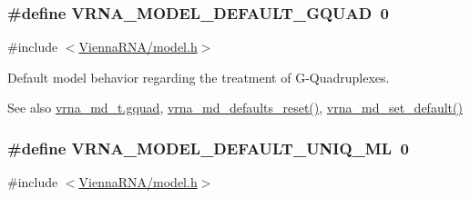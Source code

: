 \subsubsection[{\texorpdfstring{V\+R\+N\+A\+\_\+\+M\+O\+D\+E\+L\+\_\+\+D\+E\+F\+A\+U\+L\+T\+\_\+\+G\+Q\+U\+AD}{VRNA_MODEL_DEFAULT_GQUAD}}]{\setlength{\rightskip}{0pt plus 5cm}\#define V\+R\+N\+A\+\_\+\+M\+O\+D\+E\+L\+\_\+\+D\+E\+F\+A\+U\+L\+T\+\_\+\+G\+Q\+U\+AD~0}\hypertarget{group__model__details_ga793ed812e86f43799b14b2deee917f23}{}\label{group__model__details_ga793ed812e86f43799b14b2deee917f23}


{\ttfamily \#include $<$\hyperlink{model_8h}{Vienna\+R\+N\+A/model.\+h}$>$}



Default model behavior regarding the treatment of G-\/\+Quadruplexes. 

\begin{DoxySeeAlso}{See also}
\hyperlink{structvrna__md__s_af88a511a2b1f526b4c6213de6cb8fd6e}{vrna\+\_\+md\+\_\+t.\+gquad}, \hyperlink{group__model__details_ga70834424cf804d149937de89f80ceb45}{vrna\+\_\+md\+\_\+defaults\+\_\+reset()}, \hyperlink{group__model__details_ga8ac6ff84936282436f822644bf841f66}{vrna\+\_\+md\+\_\+set\+\_\+default()} 
\end{DoxySeeAlso}
\subsubsection[{\texorpdfstring{V\+R\+N\+A\+\_\+\+M\+O\+D\+E\+L\+\_\+\+D\+E\+F\+A\+U\+L\+T\+\_\+\+U\+N\+I\+Q\+\_\+\+ML}{VRNA_MODEL_DEFAULT_UNIQ_ML}}]{\setlength{\rightskip}{0pt plus 5cm}\#define V\+R\+N\+A\+\_\+\+M\+O\+D\+E\+L\+\_\+\+D\+E\+F\+A\+U\+L\+T\+\_\+\+U\+N\+I\+Q\+\_\+\+ML~0}\hypertarget{group__model__details_ga63f6006a02ba2d89148441f406c309e7}{}\label{group__model__details_ga63f6006a02ba2d89148441f406c309e7}


{\ttfamily \#include $<$\hyperlink{model_8h}{Vienna\+R\+N\+A/model.\+h}$>$}



